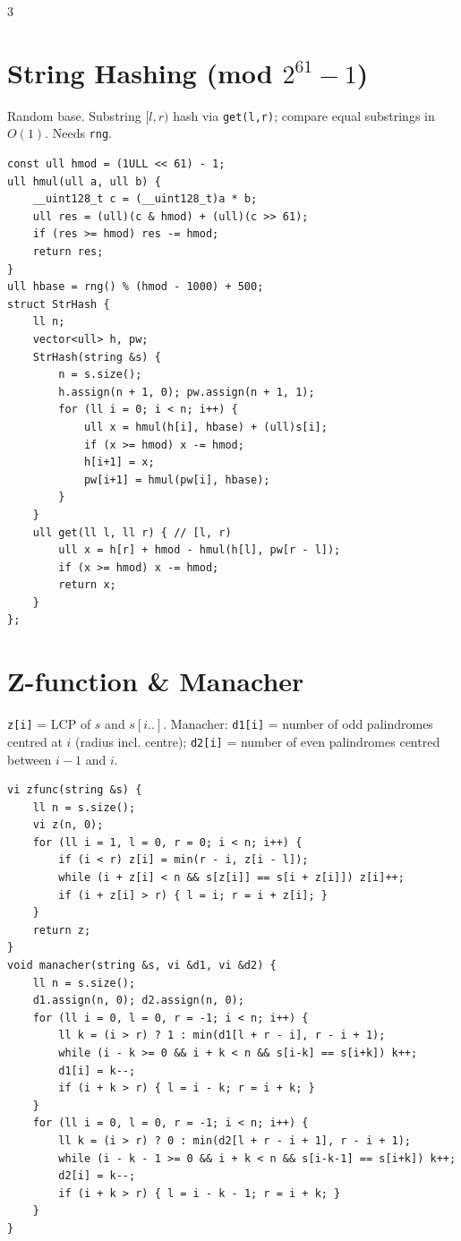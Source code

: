 \documentclass[10pt]{article}
\newcommand{\csection}[1]{\section{\textcolor{addc}{#1}}}
\newcommand{\cnote}[1]{{\scriptsize\color{addc} #1}\par}
\begin{document}
\begin{multicols*}{3}
\csection{String Hashing (mod $2^{61}-1$)}
\cnote{Random base. Substring $[l,r)$ hash via \texttt{get(l,r)}; compare equal substrings in $O(1)$. Needs \texttt{rng}.}
\begin{lstlisting}[style=cppnew]
const ull hmod = (1ULL << 61) - 1;
ull hmul(ull a, ull b) {
    __uint128_t c = (__uint128_t)a * b;
    ull res = (ull)(c & hmod) + (ull)(c >> 61);
    if (res >= hmod) res -= hmod;
    return res;
}
ull hbase = rng() % (hmod - 1000) + 500;
struct StrHash {
    ll n;
    vector<ull> h, pw;
    StrHash(string &s) {
        n = s.size();
        h.assign(n + 1, 0); pw.assign(n + 1, 1);
        for (ll i = 0; i < n; i++) {
            ull x = hmul(h[i], hbase) + (ull)s[i];
            if (x >= hmod) x -= hmod;
            h[i+1] = x;
            pw[i+1] = hmul(pw[i], hbase);
        }
    }
    ull get(ll l, ll r) { // [l, r)
        ull x = h[r] + hmod - hmul(h[l], pw[r - l]);
        if (x >= hmod) x -= hmod;
        return x;
    }
};
\end{lstlisting}

\csection{Z-function \& Manacher}
\cnote{\texttt{z[i]} = LCP of $s$ and $s[i..]$. Manacher: \texttt{d1[i]} = number of odd palindromes centred at $i$ (radius incl. centre); \texttt{d2[i]} = number of even palindromes centred between $i-1$ and $i$.}
\begin{lstlisting}[style=cppnew]
vi zfunc(string &s) {
    ll n = s.size();
    vi z(n, 0);
    for (ll i = 1, l = 0, r = 0; i < n; i++) {
        if (i < r) z[i] = min(r - i, z[i - l]);
        while (i + z[i] < n && s[z[i]] == s[i + z[i]]) z[i]++;
        if (i + z[i] > r) { l = i; r = i + z[i]; }
    }
    return z;
}
void manacher(string &s, vi &d1, vi &d2) {
    ll n = s.size();
    d1.assign(n, 0); d2.assign(n, 0);
    for (ll i = 0, l = 0, r = -1; i < n; i++) {
        ll k = (i > r) ? 1 : min(d1[l + r - i], r - i + 1);
        while (i - k >= 0 && i + k < n && s[i-k] == s[i+k]) k++;
        d1[i] = k--;
        if (i + k > r) { l = i - k; r = i + k; }
    }
    for (ll i = 0, l = 0, r = -1; i < n; i++) {
        ll k = (i > r) ? 0 : min(d2[l + r - i + 1], r - i + 1);
        while (i - k - 1 >= 0 && i + k < n && s[i-k-1] == s[i+k]) k++;
        d2[i] = k--;
        if (i + k > r) { l = i - k - 1; r = i + k; }
    }
}
\end{lstlisting}


\end{multicols*}
\end{document}

